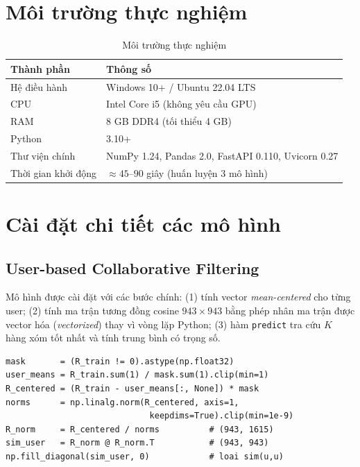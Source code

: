 ﻿\documentclass[../BTL.tex]{subfiles}
\begin{document}

\section{Môi trường thực nghiệm}
\label{section:3.5}

\begin{table}[H]
    \centering
    \caption{Môi trường thực nghiệm}
    \label{tab:env}
    \begin{tabular}{ll}
        \toprule
        \textbf{Thành phần}    & \textbf{Thông số} \\
        \midrule
        Hệ điều hành  & Windows 10+ / Ubuntu 22.04 LTS \\
        CPU           & Intel Core i5 (không yêu cầu GPU) \\
        RAM           & 8 GB DDR4 (tối thiểu 4 GB) \\
        Python        & 3.10+ \\
        Thư viện chính
            & NumPy 1.24, Pandas 2.0, FastAPI 0.110, Uvicorn 0.27 \\
        Thời gian khởi động
            & ${\approx}45$–$90$ giây (huấn luyện 3 mô hình) \\
        \bottomrule
    \end{tabular}
\end{table}

\section{Cài đặt chi tiết các mô hình}
\label{section:3.6}

\subsection{User-based Collaborative Filtering}
\label{section:3.6.1}

Mô hình được cài đặt với các bước chính: (1) tính vector
\textit{mean-centered} cho từng user; (2) tính ma trận tương đồng cosine
$943 \times 943$ bằng phép nhân ma trận được vector hóa (\textit{vectorized})
thay vì vòng lặp Python; (3) hàm \texttt{predict} tra cứu $K$ hàng xóm tốt
nhất và tính trung bình có trọng số.

\begin{lstlisting}[style=python, caption={Tính ma trận tương đồng
user-user (vectorized)}]
mask       = (R_train != 0).astype(np.float32)
user_means = R_train.sum(1) / mask.sum(1).clip(min=1)
R_centered = (R_train - user_means[:, None]) * mask
norms      = np.linalg.norm(R_centered, axis=1,
                             keepdims=True).clip(min=1e-9)
R_norm     = R_centered / norms          # (943, 1615)
sim_user   = R_norm @ R_norm.T           # (943, 943)
np.fill_diagonal(sim_user, 0)            # loai sim(u,u)
\end{lstlisting}
\end{document}
